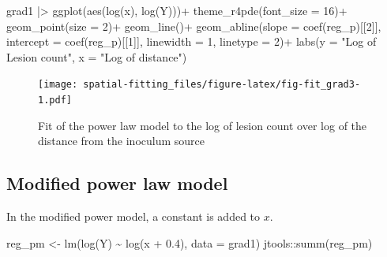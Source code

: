 \documentclass[
  letterpaper,
]{book}
\newenvironment{Shaded}{\begin{snugshade}}{\end{snugshade}}
\newcommand{\AttributeTok}[1]{\textcolor[rgb]{0.40,0.45,0.13}{#1}}
\newcommand{\DecValTok}[1]{\textcolor[rgb]{0.68,0.00,0.00}{#1}}
\newcommand{\FloatTok}[1]{\textcolor[rgb]{0.68,0.00,0.00}{#1}}
\newcommand{\FunctionTok}[1]{\textcolor[rgb]{0.28,0.35,0.67}{#1}}
\newcommand{\NormalTok}[1]{\textcolor[rgb]{0.00,0.23,0.31}{#1}}
\newcommand{\OtherTok}[1]{\textcolor[rgb]{0.00,0.23,0.31}{#1}}
\newcommand{\SpecialCharTok}[1]{\textcolor[rgb]{0.37,0.37,0.37}{#1}}
\newcommand{\StringTok}[1]{\textcolor[rgb]{0.13,0.47,0.30}{#1}}
\begin{document}
\begin{Shaded}
\begin{Highlighting}[]
\NormalTok{grad1 }\SpecialCharTok{|\textgreater{}} 
  \FunctionTok{ggplot}\NormalTok{(}\FunctionTok{aes}\NormalTok{(}\FunctionTok{log}\NormalTok{(x), }\FunctionTok{log}\NormalTok{(Y)))}\SpecialCharTok{+}
  \FunctionTok{theme\_r4pde}\NormalTok{(}\AttributeTok{font\_size =} \DecValTok{16}\NormalTok{)}\SpecialCharTok{+}
  \FunctionTok{geom\_point}\NormalTok{(}\AttributeTok{size =} \DecValTok{2}\NormalTok{)}\SpecialCharTok{+}
  \FunctionTok{geom\_line}\NormalTok{()}\SpecialCharTok{+}
  \FunctionTok{geom\_abline}\NormalTok{(}\AttributeTok{slope =} \FunctionTok{coef}\NormalTok{(reg\_p)[[}\DecValTok{2}\NormalTok{]], }\AttributeTok{intercept =} \FunctionTok{coef}\NormalTok{(reg\_p)[[}\DecValTok{1}\NormalTok{]],}
              \AttributeTok{linewidth =} \DecValTok{1}\NormalTok{, }\AttributeTok{linetype =} \DecValTok{2}\NormalTok{)}\SpecialCharTok{+}
 \FunctionTok{labs}\NormalTok{(}\AttributeTok{y =} \StringTok{"Log of Lesion count"}\NormalTok{,}
       \AttributeTok{x =} \StringTok{"Log of distance"}\NormalTok{)}
\end{Highlighting}
\end{Shaded}

\begin{figure}

\texttt{[image: spatial-fitting\_files/figure-latex/fig-fit\_grad3-1.pdf]} \hfill{}

\caption{\label{fig-fit_grad3}Fit of the power law model to the log of
lesion count over log of the distance from the inoculum source}

\end{figure}

\hypertarget{modified-power-law-model}{%
\subsection{Modified power law model}\label{modified-power-law-model}}

In the modified power model, a constant is added to \(x\).

\begin{Shaded}
\begin{Highlighting}[]
\NormalTok{reg\_pm }\OtherTok{\textless{}{-}} \FunctionTok{lm}\NormalTok{(}\FunctionTok{log}\NormalTok{(Y) }\SpecialCharTok{\textasciitilde{}} \FunctionTok{log}\NormalTok{(x }\SpecialCharTok{+} \FloatTok{0.4}\NormalTok{), }\AttributeTok{data =}\NormalTok{ grad1)}
\NormalTok{jtools}\SpecialCharTok{::}\FunctionTok{summ}\NormalTok{(reg\_pm)}
\end{Highlighting}
\end{Shaded}
\end{document}
